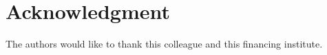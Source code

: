 \documentclass[10pt, conference]{IEEEtran}
\begin{document}
\iffinal
\section*{Acknowledgment}
%
The authors would like to thank this colleague and this financing institute.
\fi







\end{document}

